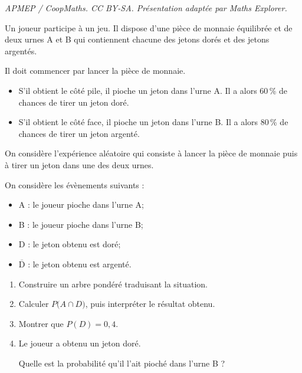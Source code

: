 \documentclass[10pt]{article}
\begin{document}
\noindent\textit{APMEP / CoopMaths. CC BY-SA. Présentation adaptée par Maths Explorer.}\par\medskip
Un joueur participe à un jeu. Il dispose d'une pièce de monnaie équilibrée et de deux urnes A et B qui contiennent chacune des jetons dorés et des jetons argentés.

Il doit commencer par lancer la pièce de monnaie.

\begin{itemize}[left=5mm]
	\item S'il obtient le côté pile, il pioche un jeton dans l'urne A. Il a alors 60\,\% de chances de tirer un jeton doré.
	\item S'il obtient le côté face, il pioche un jeton dans l'urne B. Il a alors 80\,\% de chances de tirer un jeton argenté.
\end{itemize}

On considère l'expérience aléatoire qui consiste à lancer la pièce de monnaie puis à tirer un jeton dans une des deux urnes.

On considère les évènements suivants :

\begin{itemize}[left=15mm]
		\item A : le joueur pioche dans l'urne A;
		\item B : le joueur pioche dans l'urne B;
		\item D : le jeton obtenu est doré;
		\item $\overline{\mathrm{D}}$ : le jeton obtenu est argenté.
\end{itemize}

\medskip

\begin{enumerate}
	\item Construire un arbre pondéré traduisant la situation.
	\item Calculer $P\big(A \cap D\big)$, puis interpréter le résultat obtenu.
	\item Montrer que $P(D)=0,4$.
	\item Le joueur a obtenu un jeton doré.

	Quelle est la probabilité qu'il l'ait pioché dans l'urne B ?
\end{enumerate}

\end{document}
